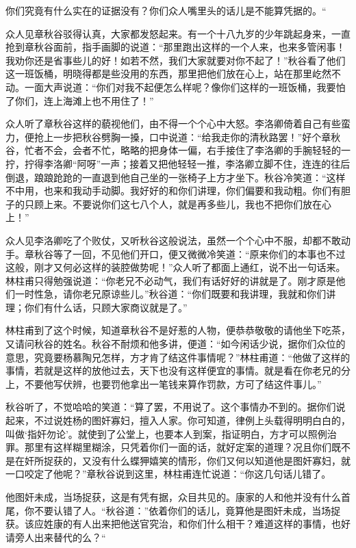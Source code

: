 \documentclass[12pt,UTF8]{ctexbook}
\begin{document}
{{{你们究竟有什么实在的证据没有？你们众人嘴里头的话儿是不能算凭据的。“

众人见章秋谷驳得认真，大家都发怒起来。有一个十八九岁的少年跳起身来，一直抢到章秋谷面前，指手画脚的说道：“那里跑出这样的一个人来，也来多管闲事！我劝你还是省事些儿的好！如若不然，我们大家就要对你不起了！”秋谷看了他们这一班饭桶，明晓得都是些没用的东西，那里把他们放在心上，站在那里屹然不动。一面大声说道：“你们对我不起便怎么样呢？像你们这样的一班饭桶，我要怕了你们，连上海滩上也不用住了！”

众人听了章秋谷这样的藐视他们，由不得一个个心中大怒。李洛卿倚着自己有些蛮力，便抢上一步把秋谷劈胸一搡，口中说道：“给我走你的清秋路罢！”好个章秋谷，忙者不会，会者不忙，略略的把身体一偏，右手接住了李洛卿的手腕轻轻的一拧，拧得李洛卿“阿呀”一声；接着又把他轻轻一推，李洛卿立脚不住，连连的往后倒退，踉踉跄跄的一直退到他自己坐的一张椅子上方才坐下。秋谷冷笑道：“这样不中用，也来和我动手动脚。我好好的和你们讲理，你们偏要和我动粗。你们有胆子的只顾上来。不要说你们这七八个人，就是再多些儿，我也不把你们放在心上！”

众人见李洛卿吃了个败仗，又听秋谷这般说法，虽然一个个心中不服，却都不敢动手。章秋谷等了一回，不见他们开口，便又微微冷笑道：“原来你们的本事也不过这般，刚才又何必这样的装腔做势呢！”众人听了都面上通红，说不出一句话来。林柱甫只得勉强说道：“你老兄不必动气，我们有话好好的讲就是了。刚才原是他们一时性急，请你老兄原谅些儿。”秋谷道：“你们既要和我讲理，我就和你们讲理；你们有什么话，只顾大家商议就是了。”

林柱甫到了这个时候，知道章秋谷不是好惹的人物，便恭恭敬敬的请他坐下吃茶，又请问秋谷的姓名。秋谷不耐烦和他多讲，便道：“如今闲话少说，据你们众位的意思，究竟要杨慕陶兄怎样，方才肯了结这件事情呢？”林柱甫道：“他做了这样的事情，若就是这样的放他过去，天下也没有这样便宜的事情。就是看在你老兄的分上，不要他写伏辨，也要罚他拿出一笔钱来算作罚款，方可了结这件事儿。”

秋谷听了，不觉哈哈的笑道：“算了罢，不用说了。这个事情办不到的。据你们说起来，不过说姓杨的图奸寡妇，擅入人家。你可知道，律例上头载得明明白白的，叫做‘指奸勿论’。就使到了公堂上，也要本人到案，指证明白，方才可以照例治罪。那里有这样糊里糊涂，只凭着你们一面的话，就好定案的道理？况且你们既不是在奸所捉获的，又没有什么蝶狎嬉笑的情形，你们又何以知道他是图奸寡妇，就一口咬定了他呢？”章秋谷说到这里，林柱甫连忙说道：“你这几句话儿错了。

他图奸未成，当场捉获，这是有凭有据，众目共见的。康家的人和他并没有什么首尾，你不要认错了人。“秋谷道：”依着你们的话儿，竟算他是图奸未成，当场捉获。该应姓康的有人出来把他送官究治，和你们什么相干？难道这样的事情，也好请旁人出来替代的么？“

}}}
\end{document}
